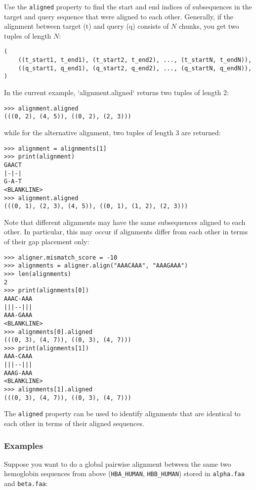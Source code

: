 Use the \verb+aligned+ property to find the start and end indices of subsequences in the target and query sequence that were aligned to each other.
Generally, if the alignment between target (t) and query (q) consists of $N$
chunks, you get two tuples of length $N$:

\begin{verbatim}
(
    ((t_start1, t_end1), (t_start2, t_end2), ..., (t_startN, t_endN)),
    ((q_start1, q_end1), (q_start2, q_end2), ..., (q_startN, q_endN)),
)
\end{verbatim}

In the current example, `alignment.aligned` returns two tuples of length 2:

\begin{verbatim}
>>> alignment.aligned
(((0, 2), (4, 5)), ((0, 2), (2, 3)))
\end{verbatim}
while for the alternative alignment, two tuples of length 3 are returned:

\begin{verbatim}
>>> alignment = alignments[1]
>>> print(alignment)
GAACT
|-|-|
G-A-T
<BLANKLINE>
>>> alignment.aligned
(((0, 1), (2, 3), (4, 5)), ((0, 1), (1, 2), (2, 3)))
\end{verbatim}
Note that different alignments may have the same subsequences aligned to each other. In particular, this may occur if alignments differ from each other in terms of their gap placement only:

\begin{verbatim}
>>> aligner.mismatch_score = -10
>>> alignments = aligner.align("AAACAAA", "AAAGAAA")
>>> len(alignments)
2
>>> print(alignments[0])
AAAC-AAA
|||--|||
AAA-GAAA
<BLANKLINE>
>>> alignments[0].aligned
(((0, 3), (4, 7)), ((0, 3), (4, 7)))
>>> print(alignments[1])
AAA-CAAA
|||--|||
AAAG-AAA
<BLANKLINE>
>>> alignments[1].aligned
(((0, 3), (4, 7)), ((0, 3), (4, 7)))
\end{verbatim}
The \verb+aligned+ property can be used to identify alignments that are identical to each other in terms of their aligned sequences.

\subsubsection{Examples}
\label{sec:pairwise-examples}

Suppose you want to do a global pairwise alignment between the same two
hemoglobin sequences from above (\texttt{HBA\_HUMAN}, \texttt{HBB\_HUMAN})
stored in \texttt{alpha.faa} and \texttt{beta.faa}:

